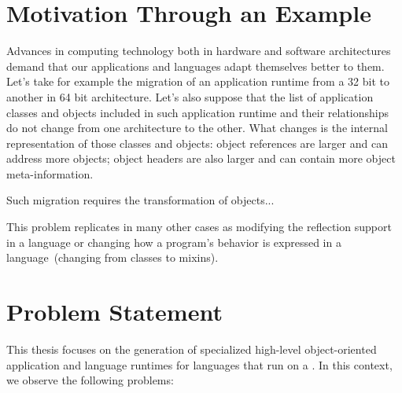 
\section{Motivation Through an Example}

Advances in computing technology both in hardware and software architectures demand that our applications and languages adapt themselves better to them. Let's take for example the migration of an application runtime from a 32 bit \VM to another \VM in 64 bit architecture. Let's also suppose that the list of application classes and objects included in such application runtime and their relationships do not change from one architecture to the other. What changes is the internal representation of those classes and objects: object references are larger and can address more objects; object headers are also larger and can contain more object meta-information.

Such migration requires the transformation of objects...

This problem replicates in many other cases as modifying the reflection support in a language or changing how a program's behavior is expressed in a language~(\eg changing from classes to mixins).

\section{Problem Statement}

This thesis focuses on the generation of specialized high-level object-oriented application and language runtimes for languages that run on a \VM. In this context, we observe the following problems:

